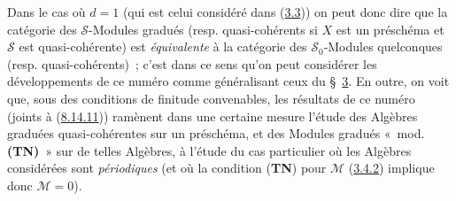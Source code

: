 \begin{remark}[8.14.12]
Dans le cas où $d=1$ (qui est celui considéré dans
(\hyperref[subsection:II.3.3-fr]{3.3})) on peut donc dire que la catégorie des
$\mathcal{S}$-Modules gradués (resp. quasi-cohérents si $X$ est un préschéma
et $\mathcal{S}$ est quasi-cohérente) est \emph{équivalente} à la catégorie
des $\mathcal{S}_0$-Modules quelconques (resp. quasi-cohérents)~; c'est dans
ce sens qu'on peut considérer les développements de ce numéro comme
généralisant ceux du \S~\hyperref[section:II.3-fr]{3}. En outre, on voit que,
sous des conditions de finitude convenables, les résultats de ce numéro
(joints à (\hyperref[II.8.14.11-fr]{8.14.11})) ramènent dans une certaine
mesure l'étude des Algèbres graduées quasi-cohérentes sur un préschéma, et des
Modules gradués «~mod. \textbf{(TN)}~» sur de telles Algèbres, à l'étude du
cas particulier où les Algèbres considérées sont \emph{périodiques} (et où
la condition (\textbf{TN}) pour $\mathcal{M}$
(\hyperref[II.3.4.2-fr]{3.4.2}) implique donc $\mathcal{M}=0$).
\end{remark}

